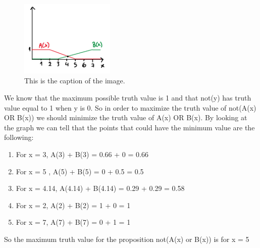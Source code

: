 \documentclass{article}
\begin{document}
\begin{figure}[h]
    \centering
    \includegraphics[width=0.4\textwidth]{pr12.png}
    \caption{This is the caption of the image.}
    
\end{figure}

\noindent \newline We know that the maximum possible truth value is 1 and that not(y) has truth value equal to 1 when y is 0. So in order to 
maximize the truth value of not(A(x) OR B(x)) we should minimize the truth value of A(x) OR B(x). By looking at the graph we can tell that the points that could have the minimum value are the following: \\
\begin{enumerate}
  \item For x = 3, A(3) + B(3) = 0.66 + 0 = 0.66
  \item For x = 5 , A(5) + B(5) = 0 + 0.5 = 0.5
  \item For x = 4.14, A(4.14) + B(4.14) = 0.29 + 0.29 = 0.58
  \item For x = 2, A(2) + B(2) = 1 + 0 = 1
  \item For x = 7, A(7) + B(7) = 0 + 1 = 1
\end{enumerate}
So the maximum truth value for the proposition not(A(x) or B(x)) is for x = 5
\end{document}
